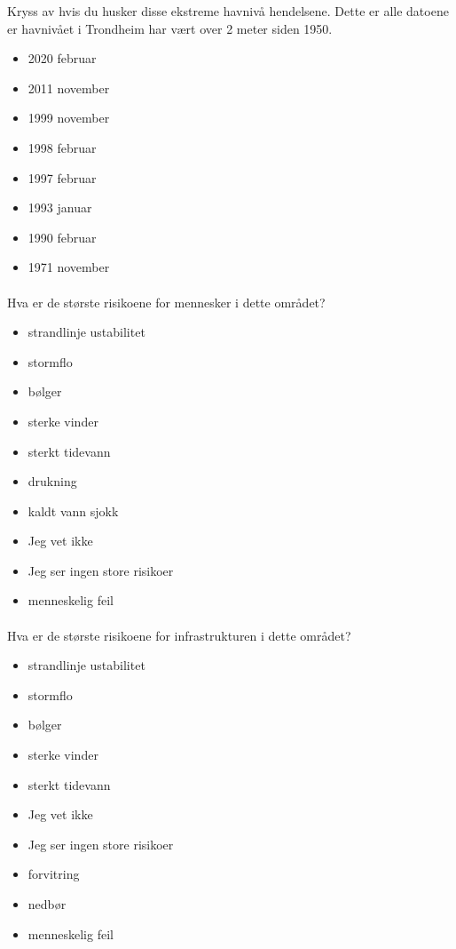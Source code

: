 Kryss av hvis du husker disse ekstreme havnivå hendelsene.
Dette er alle datoene er havnivået i Trondheim har vært over 2 meter siden 1950.
\begin{itemize}
    \item 2020 februar
    \item 2011 november
    \item 1999 november
    \item 1998 februar
    \item 1997 februar
    \item 1993 januar
    \item 1990 februar
    \item 1971 november
\end{itemize}
\paragraph{}

Hva er de største risikoene for mennesker i dette området?
\begin{itemize}
    \item strandlinje ustabilitet
    \item stormflo
    \item bølger
    \item sterke vinder
    \item sterkt tidevann
    \item drukning
    \item kaldt vann sjokk
    \item Jeg vet ikke
    \item Jeg ser ingen store risikoer
    \item menneskelig feil
\end{itemize}
\paragraph{}

Hva er de største risikoene for infrastrukturen i dette området?
\begin{itemize}
    \item strandlinje ustabilitet
    \item stormflo
    \item bølger
    \item sterke vinder
    \item sterkt tidevann
    \item Jeg vet ikke
    \item Jeg ser ingen store risikoer
    \item forvitring
    \item nedbør
    \item menneskelig feil
\end{itemize}

